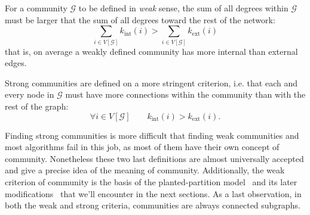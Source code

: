 For a community $\mathcal{G}$ to be defined in \emph{weak} sense, the sum of all degrees within $\mathcal{G}$ must be larger that the sum of all degrees toward the rest of the network:
\begin{equation}\label{eq:communityweak}
\sum \limits_{i \in V[\mathcal{G}]} k_{\textrm{int}}(i) > \sum \limits_{i \in V[\mathcal{G}]} k_{\textrm{ext}}(i)
\end{equation}
that is, on average a weakly defined community has more internal than external edges.

Strong communities are defined on a more stringent criterion, i.e. that each and every node in $\mathcal{G}$ must have more connections within the community than with the rest of the graph:
\begin{equation}
\forall i \in V[\mathcal{G}] \qquad k_{\textrm{int}}(i) > k_{\textrm{ext}}(i).
\end{equation}

Finding strong communities is more difficult that finding weak communities and most algorithms fail in this job, as most of them have their own concept of community. Nonetheless these two last definitions are almost universally accepted and give a precise idea of the meaning of community. Additionally, the weak criterion of community is the basis of the planted-partition model~\cite{condon2000} and its later modifications~\cite{lancichinetti2008} that we'll encounter in the next sections. As a last observation, in both the weak and strong criteria, communities are always connected subgraphs.

